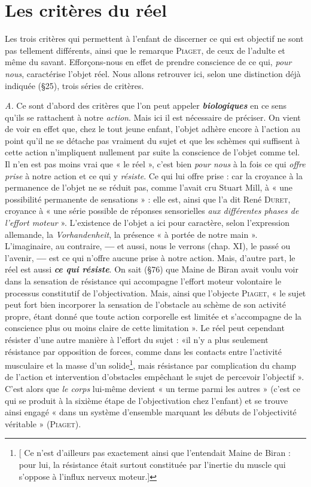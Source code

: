 \section{Les critères du réel}%
Les trois critères qui permettent
à l’enfant de discerner ce qui est objectif ne sont pas tellement
différents, ainsi que le remarque \textsc{Piaget}, de ceux de l'adulte
et même du savant. Efforçons-nous en effet de prendre conscience
de ce qui, {\it pour nous}, caractérise l’objet réel. Nous allons retrouver
ici, selon une distinction déjà indiquée (\S 25), trois séries de critères.

{\it A.} Ce sont d’abord des critères que l’on peut appeler \textbf{\textit {biologiques}}
en ce sens qu’ils se rattachent à notre {\it action}. Mais ici il est nécessaire
de préciser. On vient de voir en effet que, chez le tout jeune enfant,
l’objet adhère encore à l’action au point qu’il ne se détache pas
vraiment du sujet et que les schèmes qui suffisent à cette action
n’impliquent nullement par suite la conscience de l’objet comme tel.
Il n’en est pas moins vrai que « le réel », c’est bien {\it pour nous} à la fois
ce qui {\it offre prise} à notre action et ce qui y {\it résiste}. Ce qui lui offre
prise : car la croyance à la permanence de l’objet ne se réduit pas,
comme l'avait cru Stuart Mill, à « une possibilité permanente de sensations » :
elle est, ainsi que l’a dit René \textsc{Duret}, croyance à « une
série possible de réponses sensorielles {\it aux différentes phases de l'effort
moteur} ». L'existence de l’objet a ici pour caractère, selon l'expression
allemande, la {\it Vorhandenheit}, la présence « à portée de notre main ».
L'imaginaire, au contraire, {\bf —} et aussi, nous le verrons (chap. XI), le
passé ou l'avenir, {\bf —} est ce qui n’offre aucune prise à notre action.
Mais, d’autre part, le réel est aussi \textbf{\textit {ce qui résiste}}. On sait (\S 76) que
Maine de Biran avait voulu voir dans la sensation de résistance qui
accompagne l’effort moteur volontaire le processus constitutif de
l’objectivation. Mais, ainsi que l’objecte \textsc{Piaget}, « le sujet peut fort
bien incorporer la sensation de l’obstacle au schème de son activité
propre, étant donné que toute action corporelle est limitée et s’accompagne
de la conscience plus ou moins claire de cette limitation ». Le
réel peut cependant résister d’une autre manière à l'effort du sujet :
«il n’y a plus seulement résistance par opposition de forces, comme
dans les contacts entre l’activité musculaire et la masse d’un solide\footnote{[
Ce n’est d’ailleurs pas exactement ainsi que l’entendait Maine de Biran : pour lui,
la résistance était surtout constituée par l'inertie du muscle qui s'oppose à l'influx
nerveux moteur.]},
mais résistance par complication du champ de l’action et intervention
d'obstacles empêchant le sujet de percevoir l'objectif ». C’est
alors que {\it le corps} lui-même devient « un terme parmi les autres »
(c'est ce qui se produit à la sixième étape de l’objectivation chez
l'enfant) et se trouve ainsi engagé « dans un système d’ensemble
marquant les débuts de l'objectivité véritable » (\textsc{Piaget}).

